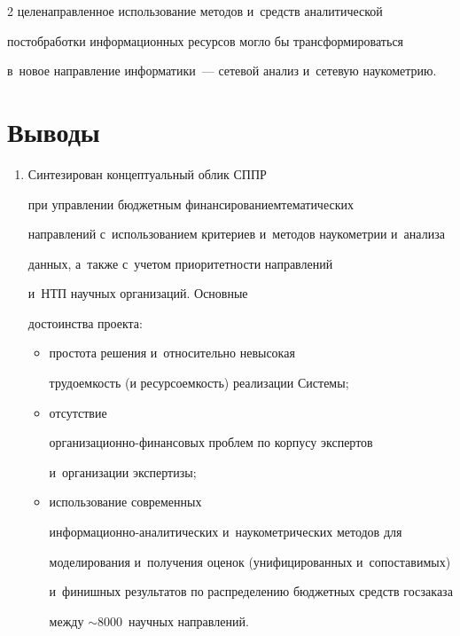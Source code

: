 \begin{multicols}{2}
целенаправленное ис\-поль\-зование методов и~средств аналитической 

пост\-обработки информационных ресурсов могло бы трансформи\-ро\-вать\-ся 

в~новое направление информатики~--- сетевой анализ и~сетевую наукометрию. 

    

    \section{Выводы}

    

    \noindent

    \begin{enumerate}[1.]

    \item  Синтезирован концептуальный облик СППР 

    при управ\-ле\-нии бюджетным финансированием\linebreak тематических 

направлений с~использованием критериев и~методов наукометрии и~анализа 

данных, а~также с~учетом приоритетности направлений  

и~НТП научных организаций. Основные 

достоинства проекта: 

\begin{itemize}

\item[(а)] простота решения и~относительно невысокая 

трудоемкость (и ресурсоемкость) реализации Системы; 

\item[(б)] отсутствие  

ор\-га\-ни\-за\-ци\-он\-но-фи\-нан\-со\-вых проблем по корпусу экспертов 

и~организации экспертизы; 

\item[(в)] использование современных  

ин\-фор\-ма\-ци\-он\-но-ана\-ли\-ти\-че\-ских и~наукометрических методов для 

моделирования и~получения оценок (унифицированных и~сопоставимых) 

и~финишных результатов по распределению бюджетных средств госзаказа 

между $\sim8000$~научных направлений.


\end{itemize}
\end{enumerate}
\end{multicols}

